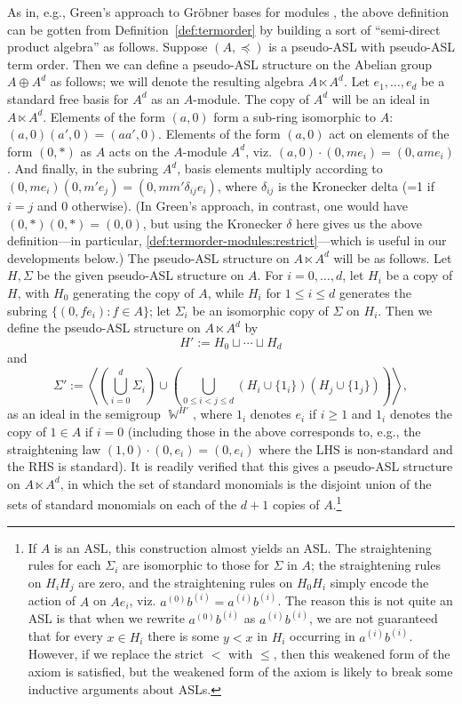\documentclass[11pt,reqno]{amsart}
\DeclareMathOperator{\W}{\mathbb{W}}
\theoremstyle{definition}
\numberwithin{equation}{section}
\begin{document}
\begin{remark}
As in, e.g., Green's approach to Gröbner bases for modules \cite{green}, the above definition can be gotten from Definition~\ref{def:termorder} by building a sort of ``semi-direct product algebra'' as follows. Suppose $(A,\preceq)$ is a pseudo-ASL with pseudo-ASL term order. Then we can define a pseudo-ASL structure on the Abelian group $A \oplus A^d$ as follows; we will denote the resulting algebra $A \ltimes A^d$. Let $e_1, \dotsc, e_d$ be a standard free basis for $A^d$ as an $A$-module. The copy of $A^d$ will be an ideal in $A \ltimes A^d$. Elements of the form $(a,0)$ form a sub-ring isomorphic to $A$: $(a,0)(a',0) = (aa',0)$. Elements of the form $(a,0)$ act on elements of the form $(0,*)$ as $A$ acts on the $A$-module $A^d$, viz. $(a,0) \cdot (0,me_i) = (0,ame_i)$. And finally, in the subring $A^d$, basis elements multiply according to $(0,me_i) (0, m' e_j) = (0, mm' \delta_{ij} e_i)$, where $\delta_{ij}$ is the Kronecker delta (=1 if $i=j$ and 0 otherwise). (In Green's approach, in contrast, one would have $(0,*)(0,*) = (0,0)$, but using the Kronecker $\delta$ here gives us the above definition---in particular, \ref{def:termorder-modules:restrict}---which is useful in our developments below.) %
The pseudo-ASL structure on $A \ltimes A^d$ will be as follows. Let $H,\Sigma$ be the given pseudo-ASL structure on $A$. For $i=0,\dotsc,d$, let $H_i$ be a copy of $H$, with $H_0$ generating the copy of $A$, while $H_i$ for $1 \leq i \leq d$ generates the subring $\{(0,f e_i) : f \in A\}$; let $\Sigma_i$ be an isomorphic copy of $\Sigma$ on $H_i$. Then we define the pseudo-ASL structure on $A \ltimes A^d$ by 
\[
H' := H_0 \sqcup \dotsb \sqcup H_d
\]
and
\[
\Sigma' := \left\langle \left(\bigcup_{i=0}^d \Sigma_i\right) \cup \left(\bigcup_{0 \leq i < j \leq d} (H_i \cup \{1_i\})(H_j \cup \{1_j\}) \right)\right\rangle,
\]
as an ideal in the semigroup $\W^{H'}$, where $1_i$ denotes $e_i$ if $i \geq 1$ and $1_i$ denotes the copy of $1 \in A$ if $i=0$ (including those in the above corresponds to, e.g., the straightening law $(1,0) \cdot (0,e_i) = (0,e_i)$ where the LHS is non-standard and the RHS is standard). It is readily verified that this gives a pseudo-ASL structure on $A \ltimes A^d$, in which the set of standard monomials is the disjoint union of the sets of standard monomials on each of the $d+1$ copies of $A$.\footnote{If $A$ is an ASL, this construction almost yields an ASL. The straightening rules for each $\Sigma_i$ are isomorphic to those for $\Sigma$ in $A$; the straightening rules on $H_i H_j$ are zero, and the straightening rules on $H_0 H_i$ simply encode the action of $A$ on $Ae_i$, viz. $a^{(0)} b^{(i)} = a^{(i)} b^{(i)}$. The reason this is not quite an ASL is that when we rewrite $a^{(0)} b^{(i)}$ as $a^{(i)} b^{(i)}$, we are not guaranteed that for every $x \in H_i$ there is some $y < x$ in $H_i$ occurring in $a^{(i)} b^{(i)}$. However, if we replace the strict $<$ with $\leq$, then this weakened form of the axiom is satisfied, but the weakened form of the axiom is likely to break some inductive arguments about ASLs.}
\end{remark}
\end{document}
